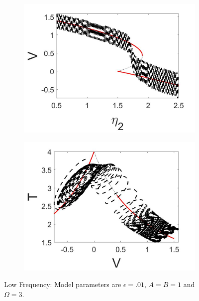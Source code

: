 \begin{figure}[H]
\centering
\begin{subfigure}{.5\textwidth}
 \centering
 \includegraphics[width=\linewidth]{conclusion/low_freq_V.jpg}
 \caption{}
\end{subfigure}%
\begin{subfigure}{.5\textwidth}
 \centering
 \includegraphics[width=\linewidth]{conclusion/low_freq_T.jpg}
 \caption{}
\end{subfigure}
\caption{Low Frequency: Model parameters are $\epsilon=.01$, $A=B=1$ and $\Omega=3$.}
\label{fig:low_freq}
\end{figure}

